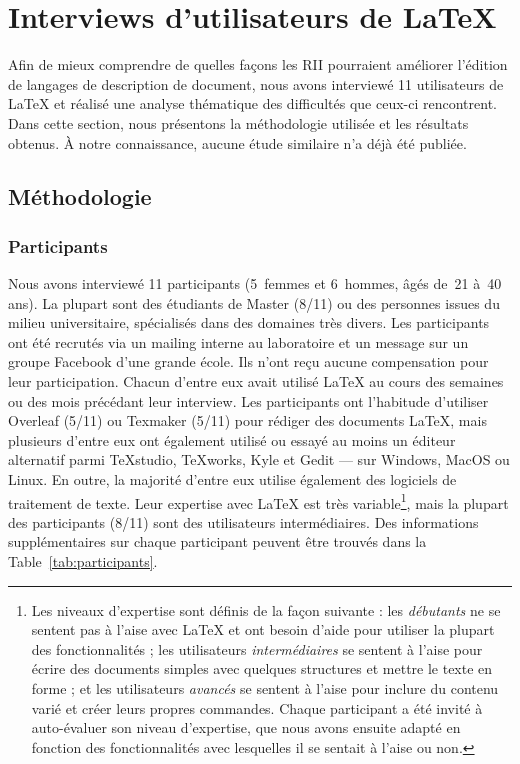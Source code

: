\section{Interviews d'utilisateurs de \LaTeX{}}
\label{sec:interviews}

Afin de mieux comprendre de quelles façons les RII pourraient améliorer l'édition de langages de description de document, nous avons interviewé 11 utilisateurs de \LaTeX{} et réalisé une analyse thématique des difficultés que ceux-ci rencontrent.
Dans cette section, nous présentons la méthodologie utilisée et les résultats obtenus.
À notre connaissance, aucune étude similaire n'a déjà été publiée.


\subsection{Méthodologie}

\subsubsection{Participants}
Nous avons interviewé 11 participants (5~femmes et 6~hommes, âgés de~21 à~40 ans).
La plupart sont des étudiants de Master (8/11) ou des personnes issues du milieu universitaire, spécialisés dans des domaines très divers.
Les participants ont été recrutés via un mailing interne au laboratoire et un message sur un groupe Facebook d'une grande école.
Ils n'ont reçu aucune compensation pour leur participation.
Chacun d'entre eux avait utilisé \LaTeX{} au cours des semaines ou des mois précédant leur interview.
Les participants ont l'habitude d'utiliser Overleaf (5/11) ou Texmaker (5/11) pour rédiger des documents \LaTeX{}, mais plusieurs d'entre eux ont également utilisé ou essayé au moins un éditeur alternatif parmi TeXstudio, TeXworks, Kyle et Gedit --- sur Windows, MacOS ou Linux.
En outre, la majorité d'entre eux utilise également des logiciels de traitement de texte.
Leur expertise avec \LaTeX{} est très variable\footnote{Les niveaux d'expertise sont définis de la façon suivante : les \emph{débutants} ne se sentent pas à l'aise avec \LaTeX{} et ont besoin d'aide pour utiliser la plupart des fonctionnalités ; les utilisateurs \emph{intermédiaires} se sentent à l'aise pour écrire des documents simples avec quelques structures et mettre le texte en forme ; et les utilisateurs \emph{avancés} se sentent à l'aise pour inclure du contenu varié et créer leurs propres commandes. Chaque participant a été invité à auto-évaluer son niveau d'expertise, que nous avons ensuite adapté en fonction des fonctionnalités avec lesquelles il se sentait à l'aise ou non.}, mais la plupart des participants (8/11) sont des utilisateurs intermédiaires.
Des informations supplémentaires sur chaque participant peuvent être trouvés dans la {Table~\ref{tab:participants}}.

